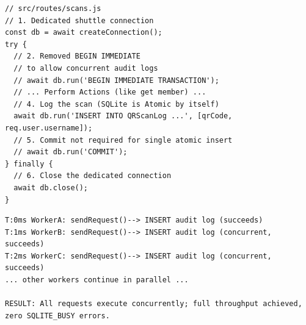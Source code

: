 \documentclass[sigconf]{acmart}
\begin{document}

\begin{lstlisting}[style=jsstyle, caption={Optimized scans.js (removed BEGIN IMMEDIATE bottleneck)}]
// src/routes/scans.js
// 1. Dedicated shuttle connection
const db = await createConnection();
try {  
  // 2. Removed BEGIN IMMEDIATE 
  // to allow concurrent audit logs
  // await db.run('BEGIN IMMEDIATE TRANSACTION'); 
  // ... Perform Actions (like get member) ...
  // 4. Log the scan (SQLite is Atomic by itself)
  await db.run('INSERT INTO QRScanLog ...', [qrCode, req.user.username]);
  // 5. Commit not required for single atomic insert
  // await db.run('COMMIT');
} finally {
  // 6. Close the dedicated connection
  await db.close();
}
\end{lstlisting}

\begin{lstlisting}[style=logstyle, caption={Race timeline without BEGIN IMMEDIATE on scans}]
T:0ms WorkerA: sendRequest()--> INSERT audit log (succeeds)
T:1ms WorkerB: sendRequest()--> INSERT audit log (concurrent, succeeds)
T:2ms WorkerC: sendRequest()--> INSERT audit log (concurrent, succeeds)
... other workers continue in parallel ...

RESULT: All requests execute concurrently; full throughput achieved, zero SQLITE_BUSY errors.
\end{lstlisting}
\end{document}
